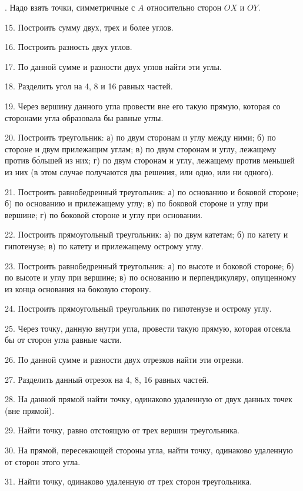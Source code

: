 \documentclass[oneside]{book}
\begin{document}
.
Надо взять точки, симметричные с $A$ относительно сторон $OX$ и $OY$.


15.
Построить сумму двух, трех и более углов.

16.
Построить разность двух углов.

17.
По данной сумме и разности двух углов найти эти углы.

18.
Разделить угол на 4, 8 и 16 равных частей.

19.
Через вершину данного угла провести вне его такую прямую, которая со сторонами угла образовала бы равные углы.

20.
Построить треугольник:
а) по двум сторонам и углу между ними;
б) по стороне и двум прилежащим углам;
в) по двум сторонам и углу, лежащему против б\'{о}льшей из них;
г) по двум сторонам и углу, лежащему против меньшей из них (в этом случае получаются два решения, или одно, или ни одного).

21.
Построить равнобедренный треугольник:
а) по основанию и боковой стороне;
б) по основанию и прилежащему углу;
в) по боковой стороне и углу при вершине;
г) по боковой стороне и углу при основании.

22.
Построить прямоугольный треугольник:
а) по двум катетам;
б) по катету и гипотенузе;
в) по катету и прилежащему острому углу.

23.
Построить равнобедренный треугольник:
а) по высоте и боковой стороне;
б) по высоте и углу при вершине;
в) по основанию и перпендикуляру, опущенному из конца основания на боковую сторону.

24.
Построить прямоугольный треугольник по гипотенузе и острому углу.

25.
Через точку, данную внутри угла, провести такую прямую, которая отсекла бы от сторон угла равные части.

26.
По данной сумме и разности двух отрезков найти эти отрезки.

27.
Разделить данный отрезок на 4, 8, 16 равных частей.

28.
На данной прямой найти точку, одинаково удаленную от двух данных точек (вне прямой).

29.
Найти точку, равно отстоящую от трех вершин треугольника.

30.
На прямой, пересекающей стороны угла, найти точку, одинаково удаленную от сторон этого угла.

31.
Найти точку, одинаково удаленную от трех сторон треугольника.
\end{document}
